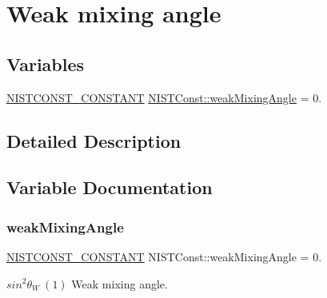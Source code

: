 \hypertarget{group___n_i_s_t_const-_weak_mixing_angle}{}\section{Weak mixing angle}
\label{group___n_i_s_t_const-_weak_mixing_angle}
\subsection*{Variables}
\begin{DoxyCompactItemize}
\item 
\mbox{\hyperlink{_n_i_s_t_const_8hpp_a2b0fc1d7452373f816175dd86ce26729}{N\+I\+S\+T\+C\+O\+N\+S\+T\+\_\+\+C\+O\+N\+S\+T\+A\+NT}} \mbox{\hyperlink{group___n_i_s_t_const-_weak_mixing_angle_ga0dc8fe82146df3a503a0120dc478588a}{N\+I\+S\+T\+Const\+::weak\+Mixing\+Angle}} = 0.
\end{DoxyCompactItemize}


\subsection{Detailed Description}


\subsection{Variable Documentation}
\mbox{\label{group___n_i_s_t_const-_weak_mixing_angle_ga0dc8fe82146df3a503a0120dc478588a}} 
\subsubsection{\texorpdfstring{weak\+Mixing\+Angle}{weakMixingAngle}}
{\footnotesize\ttfamily \mbox{\hyperlink{_n_i_s_t_const_8hpp_a2b0fc1d7452373f816175dd86ce26729}{N\+I\+S\+T\+C\+O\+N\+S\+T\+\_\+\+C\+O\+N\+S\+T\+A\+NT}} N\+I\+S\+T\+Const\+::weak\+Mixing\+Angle = 0.}

$sin^2 \theta_W \ (1)$ Weak mixing angle. 